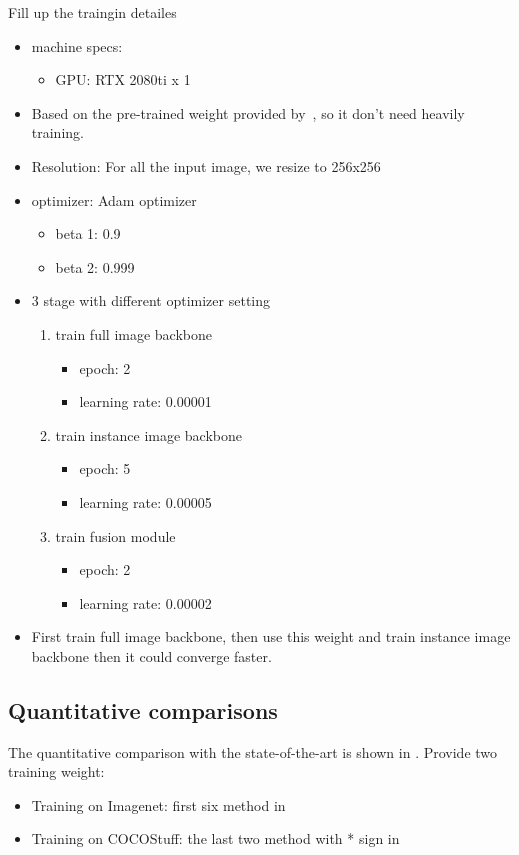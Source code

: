 {
Fill up the traingin detailes
\begin{itemize}
    \item machine specs:
    \begin{itemize}
        \item GPU: RTX 2080ti x 1
    \end{itemize}
    \item Based on the pre-trained weight provided by~\cite{Zhang-SIGGRAPH-2017}, so it don't need heavily training.
    \item Resolution: For all the input image, we resize to 256x256
    \item optimizer: Adam optimizer
    \begin{itemize}
        \item beta 1: 0.9
        \item beta 2: 0.999
    \end{itemize}
    \item 3 stage with different optimizer setting
    \begin{enumerate}
        \item train full image backbone
        \begin{itemize}
            \item epoch: 2
            \item learning rate: 0.00001
        \end{itemize}
        \item train instance image backbone
        \begin{itemize}
            \item epoch: 5
            \item learning rate:  0.00005
        \end{itemize}
        \item train fusion module
        \begin{itemize}
            \item epoch: 2
            \item learning rate: 0.00002
        \end{itemize}
    \end{enumerate}
    \item First train full image backbone, then use this weight and train instance image backbone then it could converge faster.
\end{itemize}


\subsection{Quantitative comparisons}\label{sec:quantitative}
The quantitative comparison with the state-of-the-art is shown in .
Provide two training weight:
\begin{itemize}
    \item Training on Imagenet: first six method in 
    \item Training on COCOStuff: the last two method with * sign in 
\end{itemize}

}
